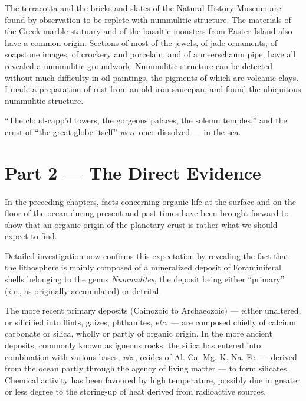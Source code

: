 \documentclass[a4paper, 12pt, oneside, landscape]{article}
\begin{document}
The terracotta and the bricks and slates of the Natural History Museum are found by observation to be replete with nummulitic structure. The materials of the Greek marble statuary and of the basaltic monsters from Easter Island also have a common origin. Sections of most of the jewels, of jade ornaments, of soapstone images, of crockery and porcelain, and of a meerschaum pipe, have all revealed a nummulitic groundwork. Nummulitic structure can be detected without much difficulty in oil paintings, the pigments of which are volcanic clays. I made a preparation of rust from an old iron saucepan, and found the ubiquitous nummulitic structure.

``The cloud-capp'd towers, the gorgeous palaces, the solemn temples,'' and the crust of ``the great globe itself'' \emph{were} once dissolved --- in the sea.
\clearpage
\section{Part 2 --- The Direct Evidence}
\paragraph{}
In the preceding chapters, facts concerning organic life at the surface and on the floor of the ocean during present and past times have been brought forward to show that an organic origin of the planetary crust is rather what we should expect to find.

Detailed investigation now confirms this expectation by revealing the fact that the lithosphere is mainly composed of a mineralized deposit of Foraminiferal shells belonging to the genus \emph{Nummulites}, the deposit being either ``primary'' (\emph{i.e.}, as originally accumulated) or detrital.

The more recent primary deposits (Cainozoic to Archaeozoic) --- either unaltered, or silicified into flints, gaizes, phthanites, \emph{etc.} --- are composed chiefly of calcium carbonate or silica, wholly or partly of organic origin. In the more ancient deposits, commonly known as igneous rocks, the silica has entered into combination with various bases, \emph{viz.}, oxides of Al. Ca. Mg. K. Na. Fe. --- derived from the ocean partly through the agency of living matter --- to form silicates. Chemical activity has been favoured by high temperature, possibly due in greater or less degree to the storing-up of heat derived from radioactive sources.
\end{document}
